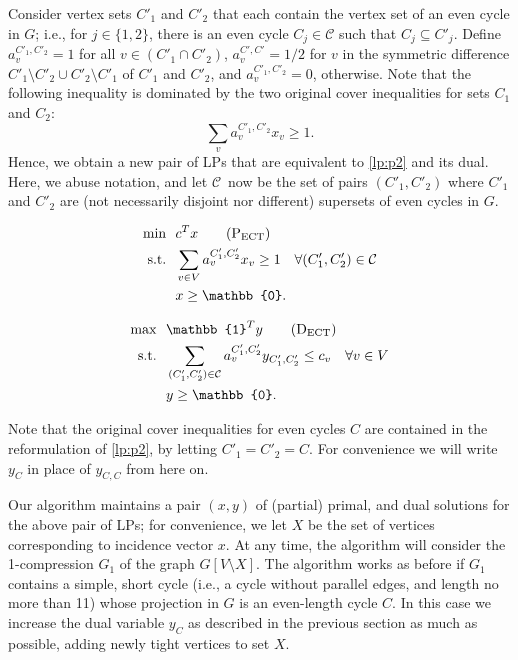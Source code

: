 \documentclass{article}
\newcommand{\st}{\ensuremath{\mbox{s.t.}}}
\newcommand{\ect}{\ensuremath{\mbox{ECT}}}
\newcommand{\C}{\ensuremath{\mathcal{C}}}
\newcommand{\0}{\mathbb{0}}
\newcommand{\1}{\mathbb{1}}
\begin{document}
Consider vertex sets $C'_1$ and $C'_2$ that each contain the  vertex set of an even cycle
in $G$; i.e., for $j \in \{1,2\}$, there is an even cycle $C_j \in \C$ such that $C_j
\subseteq C'_j$. 
Define $a_v^{C'_1,C'_2}=1$
for all $v \in (C'_1 \cap C'_2)$, $a_v^{C',C'}=1/2$ for
$v$ in the symmetric difference $C'_1\setminus C'_2 \cup C'_2 \setminus C'_1$
of $C'_1$ and $C'_2$, and
$a_v^{C'_1,C'_2}=0$, otherwise. Note that the following inequality is
dominated by the two original cover inequalities for
sets $C_1$ and $C_2$:
\[ \sum_{v} a^{C'_1,C'_2}_v x_v \geq 1. \]
Hence, we obtain a new
pair of LPs that are equivalent to \eqref{lp:p2} and its
dual. Here, we abuse notation, and let \C\ now be the set of pairs $(C'_1,C'_2)$ where
$C'_1$ and $C'_2$ are (not necessarily disjoint nor different) 
supersets of even cycles in $G$.

\medskip

\hspace*{-.7cm}
\begin{minipage}{.48\textwidth}
\begin{align}
  \min ~~ & c^Tx \tag{$\mbox{P}_{\scriptsize \ect}$} \label{lp:p3} \\
  \st ~~ & \sum_{v \in V}a^{C'_1,C'_2}_vx_v \geq 1 \quad \forall 
  (C'_1,C'_2) \in \C \notag \\
          & x \geq \0. \notag
\end{align}
\end{minipage}
\hspace*{1ex}
\vline
\hspace*{1ex}
\begin{minipage}{.48\textwidth}
\begin{align}
  \max ~~ & \1^Ty \tag{$\mbox{D}_{\scriptsize \ect}$} \label{lp:d3} \\
  \st ~~ & \sum_{(C'_1,C'_2) \in \C} a^{C'_1,C'_2}_vy_{C'_1,C'_2} \leq c_v \quad \forall v
  \in V
           \notag \\
          & y \geq \0. \notag
\end{align}
\end{minipage}
\medskip

Note that the original cover inequalities for even cycles 
$C$ are contained in the reformulation of \eqref{lp:p2}, by
letting $C'_1=C'_2=C$. For convenience we will write
$y_C$ in place of $y_{C,C}$ from here on. 

Our algorithm maintains a pair $(x,y)$ of (partial) primal,
and dual solutions for the above pair of LPs; for convenience, we let $X$ be the set of vertices
corresponding to incidence vector $x$. 
At any time, the algorithm will consider the 1-compression $G_1$
of the graph $G[V\setminus X]$. The algorithm works as before if $G_1$
contains a simple, short cycle (i.e., a cycle without parallel edges, and length no more
than 11) whose
projection in $G$ is an even-length cycle $C$. In this case we
increase the dual variable $y_{C}$ as described in the previous
section as much as possible, adding newly tight vertices to set $X$. 
\end{document}
